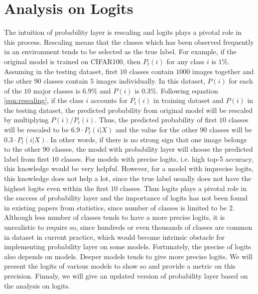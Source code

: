 \documentclass{article}
\begin{document}
{\color{blue}
\section{Analysis on Logits}
The intuition of probability layer is rescaling and logits plays a pivotal role in this process. Rescaling means that the classes which has been observed frequently in an environment tends to be selected as the true label. For example, if the original model is trained on CIFAR100, then $P_t(i)$ for any class $i$ is $1\%$. Assuming in the testing dataset, first $10$ classes contain $1000$ images together and the other $90$ classes contain $5$ images individually. In this dataset, $P(i)$ for each of the $10$ major classes is $6.9$\% and $P(i)$ is $0.3$\%. Following equation \eqref{eqn:rescaling}, if the class $i$ accounts for $P_t(i)$ in training dataset and $P(i)$ in the testing dataset, the predicted probability from original model will be rescaled by multiplying $P(i)/P_t(i)$. Thus, the predicted probability of first $10$ classes will be rescaled to be $6.9 \cdot P_t(i|X)$ and the value for the other $90$ classes will be $0.3 \cdot P_t(i|X)$. In other words, if there is no strong sign that one image belongs to the other $90$ classes, the model with probability layer will choose the predicted label from first $10$ classes. For models with precise logits, i.e. high top-5 accuracy, this knowledge would be very helpful. However, for a model with imprecise logits, this knowledge does not help a lot, since the true label usually does not have the highest logits even within the first $10$ classes. Thus logits plays a pivotal role in the success of probability layer and the importance of logits has not been found in existing papers \cite{saerens2002adjusting} from statistics, since number of classes is limited to be $2$. Although less number of classes tends to have a more precise logits, it is unrealistic to require so, since hundreds or even thousands of classes are common in dataset in current practice, which would become intrinsic obstacle for implementing probability layer on some models. Fortunately, the precise of logits also depends on models. Deeper models tends to give more precise logits. We will present the logits of various models to show so and provide a metric on this precision. Finnaly, we will give an updated version of probability layer based on the analysis on logits.

}
\end{document}
